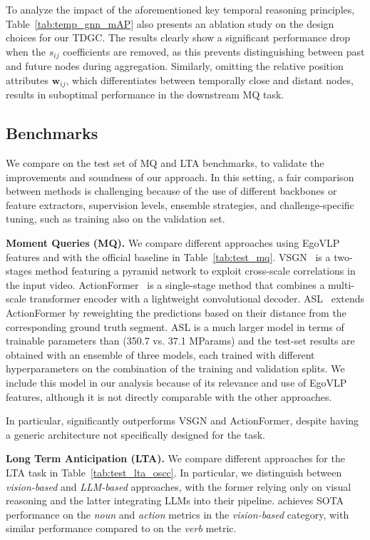 To analyze the impact of the aforementioned key temporal reasoning principles, Table~\ref{tab:temp_gnn_mAP} also presents an ablation study on the design choices for our TDGC. The results clearly show a significant performance drop when the $s_{ij}$ coefficients are removed, as this prevents distinguishing between past and future nodes during aggregation.
Similarly, omitting the relative position attributes $\mathbf{w}_{ij}$, which differentiates between temporally close and distant nodes, results in suboptimal performance in the downstream MQ task.
%




\subsection{Benchmarks}\label{sec:exp_benchmarks}
We compare \ours on the test set of MQ and LTA benchmarks, to validate the improvements and soundness of our approach.
In this setting, a fair comparison between methods is challenging because of the use of different backbones or feature extractors, supervision levels, ensemble strategies, and challenge-specific tuning, such as training also on the validation set.

\smallskip
\smallskip
\noindent\textbf{Moment Queries (MQ).}
We compare different approaches using EgoVLP features and with the official \egofourd baseline in Table~\ref{tab:test_mq}.
VSGN~\cite{zhao2021video} is a two-stages method featuring a pyramid network to exploit cross-scale correlations in the input video.
ActionFormer~\cite{zhang2022actionformer} is a single-stage method that combines a multi-scale transformer encoder with a lightweight convolutional decoder.
ASL~\cite{shao2023action} extends ActionFormer by reweighting the predictions based on their distance from the corresponding ground truth segment.
ASL is a much larger model in terms of trainable parameters than \ours (350.7 vs. 37.1 MParams) and the test-set results are obtained with an ensemble of three models, each trained with different hyperparameters on the combination of the training and validation splits. We include this model in our analysis because of its relevance and use of EgoVLP features, although it is not directly comparable with the other approaches.

In particular, \ours significantly outperforms VSGN and ActionFormer, despite having a generic architecture not specifically designed for the task.

\smallskip
\smallskip
\noindent\textbf{Long Term Anticipation (LTA).}
We compare different approaches for the LTA task in Table~\ref{tab:test_lta_oscc}.
In particular, we distinguish between \emph{vision-based} and \emph{LLM-based} approaches, with the former relying only on visual reasoning and the latter integrating LLMs into their pipeline.
\ours achieves SOTA performance on the \emph{noun} and \emph{action} metrics in the \emph{vision-based} category, with similar performance compared to \ourscvpr on the \emph{verb} metric.



